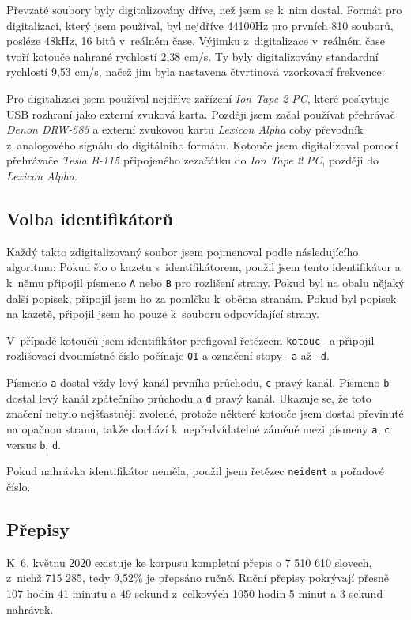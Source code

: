 Převzaté soubory byly digitalizovány dříve, než jsem se k~nim dostal. Formát pro digitalizaci, který jsem používal, byl
nejdříve 44100Hz pro prvních 810 souborů, posléze 48kHz,
16 bitů v~reálném čase. Výjimku z~digitalizace v~reálném čase tvoří
kotouče nahrané rychlostí 2,38 cm/s. Ty byly digitalizovány standardní
rychlostí 9,53 cm/s, načež jim byla nastavena čtvrtinová vzorkovací
frekvence.

Pro digitalizaci jsem používal nejdříve zařízení {\em Ion Tape 2 PC}, které
poskytuje USB rozhraní jako externí zvuková karta. Později jsem začal používat
přehrávač {\em Denon DRW-585} a externí zvukovou kartu {\em Lexicon Alpha} coby převodník
z~analogového signálu do digitálního formátu. Kotouče jsem digitalizoval pomocí
přehrávače {\em Tesla B-115} připojeného zezačátku do {\em Ion Tape 2 PC},
později do {\em Lexicon Alpha}.

\subsection{Volba identifikátorů}

Každý takto zdigitalizovaný soubor jsem pojmenoval podle následujícího
algoritmu: Pokud šlo o kazetu s~identifikátorem, použil jsem tento identifikátor
a k~němu připojil písmeno \texttt{A} nebo \texttt{B} pro rozlišení strany. Pokud
byl na obalu nějaký další popisek, připojil jsem ho za pomlčku k~oběma stranám.
Pokud byl popisek na kazetě, připojil jsem ho pouze k~souboru odpovídající strany.

V~případě
kotoučů jsem identifikátor prefigoval řetězcem \texttt{kotouc-} a připojil
rozlišovací dvoumístné číslo počínaje \texttt{01} a označení stopy \texttt{-a}
až \texttt{-d}.

Písmeno \texttt{a} dostal vždy levý kanál prvního průchodu, \texttt{c} pravý
kanál. Písmeno \texttt{b} dostal levý kanál zpátečního průchodu a \texttt{d}
pravý kanál. Ukazuje se, že toto značení nebylo nejšťastněji zvolené, protože
některé kotouče jsem dostal převinuté na opačnou stranu, takže dochází
k~nepředvídatelné záměně mezi písmeny \texttt{a}, \texttt{c} versus \texttt{b},
\texttt{d}.

Pokud nahrávka identifikátor neměla, použil jsem řetězec \texttt{neident} a
pořadové číslo.

\subsection{Přepisy}

K~6. květnu 2020 existuje ke korpusu kompletní přepis o 7 510 610
slovech, z~nichž 715 285, tedy 9,52\% je přepsáno ručně.
Ruční přepisy pokrývají přesně 107 hodin 41 minutu a 49 sekund z~celkových
1050 hodin 5 minut a 3 sekund nahrávek.


